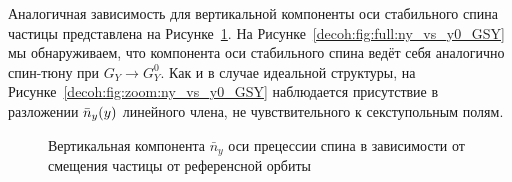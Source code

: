 Аналогичная зависимость для вертикальной компоненты оси стабильного спина частицы представлена на Рисунке~\ref{decoh:fig:ny_vs_y0_GSY}. На Рисунке~\ref{decoh:fig:full:ny_vs_y0_GSY} мы обнаруживаем, что компонента оси стабильного спина ведёт себя аналогично спин-тюну при $G_Y \rightarrow G_Y^0$. Как и в случае идеальной структуры, на Рисунке~\ref{decoh:fig:zoom:ny_vs_y0_GSY} наблюдается присутствие в разложении $\bar n_y(y)$ линейного члена, не чувствительного к секступольным полям.

\begin{figure}[H]
	\centering
	\caption{Вертикальная компонента $\bar n_y$ оси прецессии спина в зависимости от смещения частицы от референсной орбиты\label{decoh:fig:ny_vs_y0_GSY}}
\end{figure}

